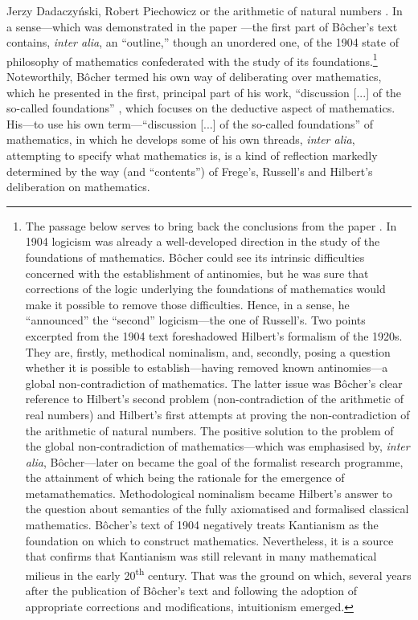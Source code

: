 \begin{artengenv}{Jerzy Dadaczyński, Robert Piechowicz}
or the arithmetic of natural numbers 
\parencite[][]{hilbert_uber_1905}.
In a sense---which was demonstrated in the paper 
\parencite[][]{dadaczynski_tendencje_2015}---the first part of Bôcher's text contains, \textit{inter alia}, an ``outline,'' though an unordered one, of the 1904 state of philosophy of mathematics confederated with the study of its foundations.\footnote{The passage below serves to bring back the conclusions from the paper 
\parencite[][]{dadaczynski_tendencje_2015}.
 In 1904 logicism was already a well-developed direction in the study of the foundations of mathematics. Bôcher could see its intrinsic difficulties concerned with the establishment of antinomies, but he was sure that corrections of the logic underlying the foundations of mathematics would make it possible to remove those difficulties. Hence, in a sense, he ``announced'' the ``second'' logicism---the one of Russell's. Two points excerpted from the 1904 text foreshadowed Hilbert's formalism of the 1920s. They are, firstly, methodical nominalism, and, secondly, posing a question whether it is possible to establish---having removed known antinomies---a global non-contradiction of mathematics. The latter issue was Bôcher's clear reference to Hilbert's second problem (non-contradiction of the arithmetic of real numbers) and Hilbert's first attempts at proving the non-contradiction of the arithmetic of natural numbers. The positive solution to the problem of the global non-contradiction of mathematics---which was emphasised by, \textit{inter alia}, Bôcher---later on became the goal of the formalist research programme, the attainment of which being the rationale for the emergence of metamathematics. Methodological nominalism became Hilbert's answer to the question about semantics of the fully axiomatised and formalised classical mathematics. Bôcher's text of 1904 negatively treats Kantianism as the foundation on which to construct mathematics. Nevertheless, it is a source that confirms that Kantianism was still relevant in many mathematical milieus in the early 20\textsuperscript{th} century. That was the ground on which, several years after the publication of Bôcher's text and following the adoption of appropriate corrections and modifications, intuitionism emerged.} Noteworthily, Bôcher termed his own way of deliberating over mathematics, which he presented in the first, principal part of his work, ``discussion [...] of the so-called foundations'' 
\parencite[][pp.132–133]{bocher_fundamental_1904},
 which focuses on the deductive aspect of mathematics. His---to use his own term---``discussion [...] of the so-called foundations'' of mathematics, in which he develops some of his own threads, \textit{inter alia}, attempting to specify what mathematics is, is a kind of reflection markedly determined by the way (and ``contents'') of Frege's, Russell's and Hilbert's deliberation on mathematics.


\end{artengenv}

